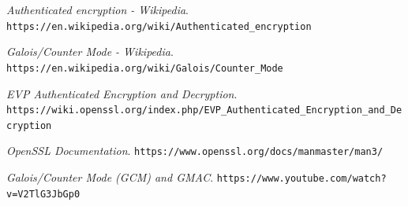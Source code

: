 \documentclass[11pt]{article}
\begin{document}
\vfill
\begin{thebibliography}{99}

{\em Authenticated encryption - Wikipedia}. \newline
  \verb|https://en.wikipedia.org/wiki/Authenticated_encryption|

{\em Galois/Counter Mode - Wikipedia}. \newline
  \verb|https://en.wikipedia.org/wiki/Galois/Counter_Mode|

{\em EVP Authenticated Encryption and Decryption}. \newline
  \verb|https://wiki.openssl.org/index.php/EVP_Authenticated_Encryption_and_Decryption|

{\em OpenSSL Documentation}. \newline
\verb|https://www.openssl.org/docs/manmaster/man3/|

{\em Galois/Counter Mode (GCM) and GMAC}. \newline
\verb|https://www.youtube.com/watch?v=V2TlG3JbGp0|

\end{thebibliography}
\end{document}
